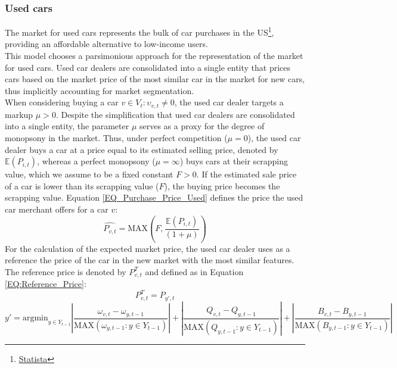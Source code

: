 \documentclass[12pt]{article}
\begin{document}
	\subsubsection{Used cars} \label{Model:Used_Cars}
	The market for used cars represents the bulk of car purchases in the US\footnote{\href{https://www.statista.com/statistics/183713/value-of-us-passenger-cas-sales-and-leases-since-1990/}{Statista}}, providing an affordable alternative to low-income users.\\
	This model chooses a parsimonious approach for the representation of the market for used cars. Used car dealers are consolidated into a single entity that prices cars based on the market price of the most similar car in the market for new cars, thus implicitly accounting for market segmentation.\\
	When considering buying a car $v\in{V_t}:\upsilon_{v,t}\neq{0}$, the used car dealer targets a markup $\mu>0$. Despite the simplification that used car dealers are consolidated into a single entity, the parameter $\mu$ serves as a proxy for the degree of monopsony in the market. Thus, under perfect competition ($\mu=0$), the used car dealer buys a car at a price equal to its estimated selling price, denoted by $\mathbb{E}({P}_{i,t})$, whereas a perfect monopsony ($\mu=\infty$) buys cars at their scrapping value, which we assume to be a fixed constant $F>0$. If the estimated sale price of a car is lower than its scrapping value ($F$), the buying price becomes the scrapping value. Equation \ref{EQ_Purchase_Price_Used} defines the price the used car merchant offers for a car $v$:
	\begin{equation}
		\hat{P_{v,t}}=\text{MAX}\left(F,\frac{\mathbb{E}({P}_{i,t})}{(1+\mu)}\right)
		\label{EQ_Purchase_Price_Used}
	\end{equation}
	For the calculation of the expected market price, the used car dealer uses as a reference the price of the car in the new market with the most similar features. The reference price is denoted by $P^T_{v,t}$ and defined as in Equation \ref{EQ:Reference_Price}:
	\begin{equation}
		P^T_{v,t} = P_{y',t}
		\label{EQ:Reference_Price}
	\end{equation}
	\small{
		\begin{equation}
			y'=\text{argmin}_{y\in{Y_{t-1}}}\left|\frac{\omega_{v,t}-\omega_{y,t-1}}{\text{MAX}(\omega_{y,t-1}:y\in Y_{t-1})}\right|+\left|\frac{Q_{v,t}-Q_{y,t-1}}{\text{MAX}(Q_{y,t-1}:y\in Y_{t-1})}\right|+\left|\frac{B_{v,t}-B_{y,t-1}}{\text{MAX}(B_{y,t-1}:y\in Y_{t-1})}\right|
			\label{EQ:Reference_Car}
		\end{equation}
	}
\end{document}
